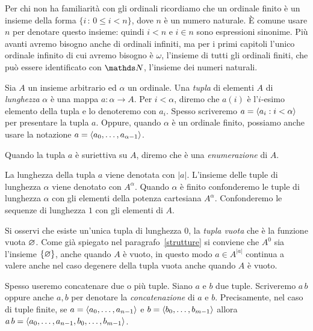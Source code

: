 Per chi non ha familiarit\`a con gli ordinali ricordiamo che un ordinale finito \`e un insieme della forma $\{i\,:\,0\le i<n\}$, dove $n$ \`e un numero naturale. \`E comune usare \emph{$n$\/} per denotare questo insieme: quindi $i<n$ e $i\in n$ sono espressioni sinonime. Pi\`u avanti avremo bisogno anche di ordinali infiniti, ma per i primi capitoli l'unico ordinale infinito di cui avremo bisogno \`e \emph{$\omega$}, l'insieme di tutti gli ordinali finiti, che pu\`o essere identificato con $\NN$, l'insieme dei numeri naturali.

Sia $A$ un insieme arbitrario ed $\alpha$ un ordinale. Una \emph{tupla\/} di elementi $A$ di \emph{lunghezza\/} $\alpha$ \`e una mappa $a:\alpha\to A$. Per $i<\alpha$, diremo che $a(i)$ \`e l'$i$-esimo elemento della tupla e lo denoteremo con \emph{$a_i$}.  Spesso scriveremo  \emph{$a=\langle a_i: i<\alpha\rangle$} per presentare la tupla $a$.  Oppure, quando $\alpha$ \`e un ordinale finito, possiamo anche usare la notazione \emph{$a=\langle a_0,\dots,a_{\alpha-1}\rangle$}. 

Quando la tupla $a$ \`e suriettiva su $A$, diremo che \`e una \emph{enumerazione\/} di $A$.


La lunghezza della tupla $a$ viene denotata con \emph{$|a|$}. L'insieme delle tuple di lunghezza $\alpha$ viene denotato con $A^\alpha$. Quando $\alpha$ \`e finito confonderemo le tuple di lunghezza $\alpha$ con gli elementi della potenza cartesiana $A^\alpha$. Confonderemo le sequenze di lunghezza $1$ con gli elementi di $A$. 

Si osservi che esiste un'unica tupla di lunghezza $0$, la \emph{tupla vuota} che \`e la funzione vuota $\varnothing$. Come gi\`a spiegato nel paragrafo~\ref{strutture} si conviene che $A^0$ sia l'insieme $\{\varnothing\}$, anche quando $A$ \`e vuoto, in questo modo $a\in A^{|a|}$ continua a valere anche nel caso degenere della tupla vuota anche quando $A$ \`e vuoto.

Spesso useremo concatenare due o pi\`u tuple. Siano $a$ e $b$ due tuple. Scriveremo \emph{$a\,b$\/} oppure anche \emph{$a,b$\/} per denotare la \emph{concatenazione\/} di $a$ e $b$. Precisamente, nel caso di tuple finite, se $a=\langle a_0,\dots,a_{n-1}\rangle$ e  $b=\langle b_0,\dots,b_{m-1}\rangle$ allora $a\,b=\langle a_0,\dots,a_{n-1},b_0,\dots,b_{m-1}\rangle$.%

